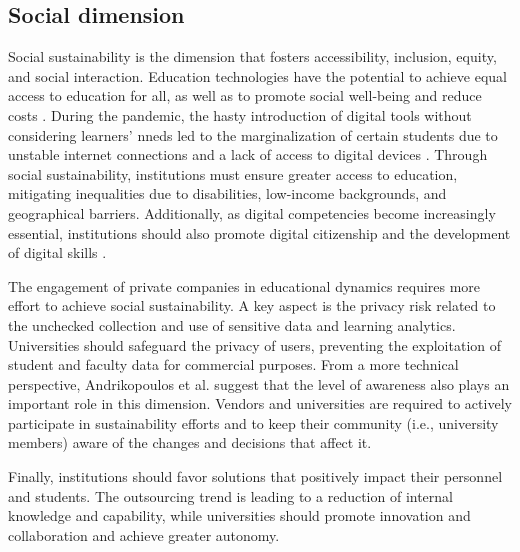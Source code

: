 \newpage %

\subsection{Social dimension}
Social sustainability is the dimension that fosters accessibility, inclusion, equity, and social interaction. Education technologies have the potential to achieve equal access to education for all, as well as to promote social well-being and reduce costs \cite{haleem_understanding_2022}. During the pandemic, the hasty introduction of digital tools without considering learners' nneds led to the marginalization of certain students due to unstable internet connections and a lack of access to digital devices \cite{haleem_understanding_2022}. Through social sustainability, institutions must ensure greater access to education, mitigating inequalities due to disabilities, low-income backgrounds, and geographical barriers. Additionally, as digital competencies become increasingly essential, institutions should also promote digital citizenship and the development of digital skills \cite{crick_covid-19_2021}.

The engagement of private companies in educational dynamics requires more effort to achieve social sustainability. A key aspect is the privacy risk related to the unchecked collection and use of sensitive data and learning analytics\cite{komljenovic_rise_2021}. Universities should safeguard the privacy of users, preventing the exploitation of student and faculty data for commercial purposes. From a more technical perspective, Andrikopoulos et al. suggest that the level of awareness also plays an important role in this dimension\cite{andrikopoulos_software_2021}. Vendors and universities are required to actively participate in sustainability efforts and to keep their community (i.e., university members) aware of the changes and decisions that affect it.

Finally, institutions should favor solutions that positively impact their personnel and students. The outsourcing trend is leading to a reduction of internal knowledge and capability, while universities should promote innovation and collaboration and achieve greater autonomy.

